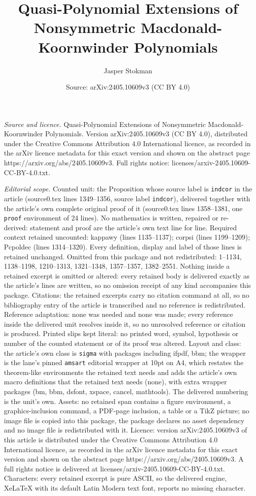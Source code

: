 \documentclass[10pt,a4paper]{amsart}
\title[Quasi-Polynomial Extensions of Nonsymmetric Macdonald-Koornw]{Quasi-Polynomial Extensions of Nonsymmetric Macdonald-Koornwinder Polynomials}
\author{Jasper Stokman}
\date{Source: arXiv:2405.10609v3 (CC BY 4.0)}
\begin{document}
\maketitle

\noindent\emph{Source and licence.} Quasi-Polynomial Extensions of Nonsymmetric Macdonald-Koornwinder Polynomials. Version arXiv:2405.10609v3 (CC BY 4.0), distributed under the Creative Commons Attribution 4.0 International licence, as recorded in the arXiv licence metadata for this exact version and shown on the abstract page https://arxiv.org/abs/2405.10609v3. Full rights notice: licenses/arxiv-2405.10609-CC-BY-4.0.txt.\par\smallskip

\noindent\textit{Editorial scope.} Counted unit: the Proposition whose source label is \texttt{indcor} in the article (source0.tex lines 1349--1356, source label \texttt{indcor}), delivered together with the article's own complete original proof of it (source0.tex lines 1358--1381, one \texttt{proof} environment of 24 lines). No mathematics is written, repaired or re-derived: statement and proof are the article's own text line for line. Required context retained uncounted: kappawy (lines 1135--1137); corpsi (lines 1199--1209); Pcpoldec (lines 1314--1320). Every definition, display and label of those lines is retained unchanged. Omitted from this package and not redistributed: 1--1134, 1138--1198, 1210--1313, 1321--1348, 1357--1357, 1382--2551. Nothing inside a retained excerpt is omitted or altered: every retained body is delivered exactly as the article's lines are written, so no omission receipt of any kind accompanies this package. Citations: the retained excerpts carry no citation command at all, so no bibliography entry of the article is transcribed and no reference is redistributed. Reference adaptation: none was needed and none was made; every reference inside the delivered unit resolves inside it, so no unresolved reference or citation is produced. Printed slips kept literal: no printed word, symbol, hypothesis or number of the counted statement or of its proof was altered. Layout and class: the article's own class is \texttt{sigma} with packages including ifpdf, bbm; the wrapper is the lane's pinned \texttt{amsart} editorial wrapper at 10pt on A4, which restates the theorem-like environments the retained text needs and adds the article's own macro definitions that the retained text needs (none), with extra wrapper packages (bm, bbm, dsfont, xspace, cancel, mathtools). The delivered numbering is the unit's own. Assets: no retained span contains a figure environment, a graphics-inclusion command, a PDF-page inclusion, a table or a TikZ picture; no image file is copied into this package, the package declares no asset dependency and no image file is redistributed with it. Licence: version arXiv:2405.10609v3 of this article is distributed under the Creative Commons Attribution 4.0 International licence, as recorded in the arXiv licence metadata for this exact version and shown on the abstract page https://arxiv.org/abs/2405.10609v3. A full rights notice is delivered at licenses/arxiv-2405.10609-CC-BY-4.0.txt. Characters: every retained excerpt is pure ASCII, so the delivered engine, XeLaTeX with its default Latin Modern text font, reports no missing character.
\end{document}
